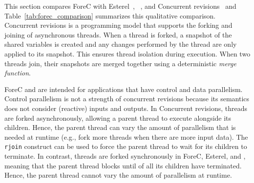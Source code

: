 This section compares ForeC with
Esterel~\cite{timed_esterel}, \pretc{}~\cite{pret_pretc}, and Concurrent
revisions~\cite{BurckhardtL11} and Table~\ref{tab:forec_comparison}
summarizes this qualitative comparison. Concurrent revisions is 
a programming model that supports the forking and joining of asynchronous 
threads. When a thread is forked, a snapshot of the shared variables is 
created and any changes performed by the thread are only applied to its 
snapshot. This ensures thread isolation during execution. When two threads
join, their snapshots are merged together using a deterministic \emph{merge 
function}.

ForeC and \pretc{} are intended for applications that have
control and data parallelism. Control parallelism is not a
strength of concurrent revisions because its semantics does
not consider (reactive) inputs and outputs. 
In Concurrent revisions, 
threads are forked asynchronously, allowing a parent thread 
to execute alongside its children. Hence, the parent thread 
can vary the amount of parallelism that is needed at runtime 
(e.g., fork more threads when there are more input data).
The \texttt{rjoin} construct can be used to force the parent 
thread to wait for its children to terminate.
In contrast, threads are forked synchronously in ForeC, Esterel, 
and \pretc{}, meaning that the parent thread blocks until of all its
children have terminated. Hence, the parent thread cannot
vary the amount of parallelism at runtime.

